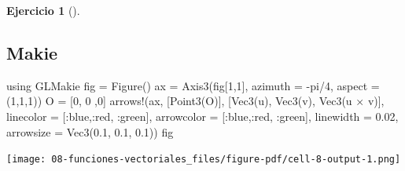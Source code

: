 \documentclass[
  a4paper,
]{scrreport}
\newenvironment{Shaded}{\begin{snugshade}}{\end{snugshade}}
\newcommand{\BuiltInTok}[1]{\textcolor[rgb]{0.00,0.23,0.31}{#1}}
\newcommand{\ConstantTok}[1]{\textcolor[rgb]{0.56,0.35,0.01}{#1}}
\newcommand{\FloatTok}[1]{\textcolor[rgb]{0.68,0.00,0.00}{#1}}
\newcommand{\FunctionTok}[1]{\textcolor[rgb]{0.28,0.35,0.67}{#1}}
\newcommand{\ImportTok}[1]{\textcolor[rgb]{0.00,0.46,0.62}{#1}}
\newcommand{\NormalTok}[1]{\textcolor[rgb]{0.00,0.23,0.31}{#1}}
\newcommand{\OperatorTok}[1]{\textcolor[rgb]{0.37,0.37,0.37}{#1}}
\theoremstyle{definition}
\newtheorem{exercise}{Ejercicio}[chapter]
\theoremstyle{remark}
\begin{document}
\begin{exercise}[]
\begin{enumerate}
\begin{tcolorbox}
  \section{Makie}

\begin{Shaded}
\begin{Highlighting}[]
\ImportTok{using} \BuiltInTok{GLMakie}
\NormalTok{fig }\OperatorTok{=} \FunctionTok{Figure}\NormalTok{()}
\NormalTok{ax }\OperatorTok{=} \FunctionTok{Axis3}\NormalTok{(fig[}\FloatTok{1}\NormalTok{,}\FloatTok{1}\NormalTok{], azimuth }\OperatorTok{=} \OperatorTok{{-}}\ConstantTok{pi}\OperatorTok{/}\FloatTok{4}\NormalTok{, aspect }\OperatorTok{=}\NormalTok{ (}\FloatTok{1}\NormalTok{,}\FloatTok{1}\NormalTok{,}\FloatTok{1}\NormalTok{))}
\NormalTok{O }\OperatorTok{=}\NormalTok{ [}\FloatTok{0}\NormalTok{, }\FloatTok{0}\NormalTok{ ,}\FloatTok{0}\NormalTok{]}
\FunctionTok{arrows!}\NormalTok{(ax, [}\FunctionTok{Point3}\NormalTok{(O)], [}\FunctionTok{Vec3}\NormalTok{(u), }\FunctionTok{Vec3}\NormalTok{(v), }\FunctionTok{Vec3}\NormalTok{(u }\OperatorTok{×}\NormalTok{ v)], }
\NormalTok{    linecolor }\OperatorTok{=}\NormalTok{ [}\OperatorTok{:}\NormalTok{blue,}\OperatorTok{:}\NormalTok{red, }\OperatorTok{:}\NormalTok{green], arrowcolor }\OperatorTok{=}\NormalTok{ [}\OperatorTok{:}\NormalTok{blue,}\OperatorTok{:}\NormalTok{red, }\OperatorTok{:}\NormalTok{green],}
\NormalTok{    linewidth }\OperatorTok{=} \FloatTok{0.02}\NormalTok{, arrowsize }\OperatorTok{=} \FunctionTok{Vec3}\NormalTok{(}\FloatTok{0.1}\NormalTok{, }\FloatTok{0.1}\NormalTok{, }\FloatTok{0.1}\NormalTok{))}
\NormalTok{fig}
\end{Highlighting}
\end{Shaded}

  \texttt{[image: 08-funciones-vectoriales\_files/figure-pdf/cell-8-output-1.png]}

  \end{tcolorbox}
\end{enumerate}

\end{exercise}
\end{document}
